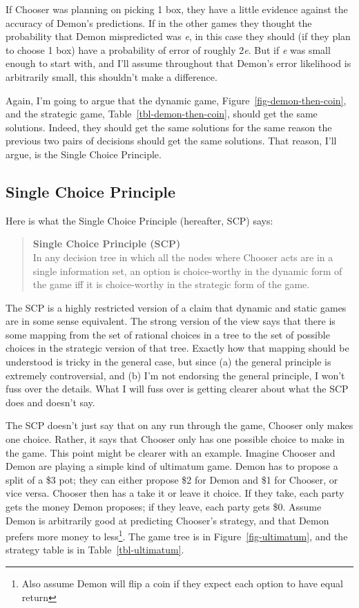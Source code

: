 \documentclass[
  10pt,
  letterpaper,
  DIV=11,
  numbers=noendperiod,
  twoside]{scrartcl}
\begin{document}
If Chooser was planning on picking 1 box, they have a little evidence
against the accuracy of Demon's predictions. If in the other games they
thought the probability that Demon mispredicted was \emph{e}, in this
case they should (if they plan to choose 1 box) have a probability of
error of roughly 2\emph{e}. But if \emph{e} was small enough to start
with, and I'll assume throughout that Demon's error likelihood is
arbitrarily small, this shouldn't make a difference.

Again, I'm going to argue that the dynamic game,
Figure~\ref{fig-demon-then-coin}, and the strategic game,
Table~\ref{tbl-demon-then-coin}, should get the same solutions. Indeed,
they should get the same solutions for the same reason the previous two
pairs of decisions should get the same solutions. That reason, I'll
argue, is the Single Choice Principle.

\subsection{Single Choice Principle}\label{sec-scp-definition}

Here is what the Single Choice Principle (hereafter, SCP) says:

\begin{quote}
\textbf{Single Choice Principle (SCP)}\\
In any decision tree in which all the nodes where Chooser acts are in a
single information set, an option is choice-worthy in the dynamic form
of the game iff it is choice-worthy in the strategic form of the game.
\end{quote}

The SCP is a highly restricted version of a claim that dynamic and
static games are in some sense equivalent. The strong version of the
view says that there is some mapping from the set of rational choices in
a tree to the set of possible choices in the strategic version of that
tree. Exactly how that mapping should be understood is tricky in the
general case, but since (a) the general principle is extremely
controversial, and (b) I'm not endorsing the general principle, I won't
fuss over the details. What I will fuss over is getting clearer about
what the SCP does and doesn't say.

The SCP doesn't just say that on any run through the game, Chooser only
makes one choice. Rather, it says that Chooser only has one possible
choice to make in the game. This point might be clearer with an example.
Imagine Chooser and Demon are playing a simple kind of ultimatum game.
Demon has to propose a split of a \$3 pot; they can either propose \$2
for Demon and \$1 for Chooser, or vice versa. Chooser then has a take it
or leave it choice. If they take, each party gets the money Demon
proposes; if they leave, each party gets \$0. Assume Demon is
arbitrarily good at predicting Chooser's strategy, and that Demon
prefers more money to less\footnote{Also assume Demon will flip a coin
  if they expect each option to have equal return}. The game tree is in
Figure~\ref{fig-ultimatum}, and the strategy table is in
Table~\ref{tbl-ultimatum}.
\end{document}
